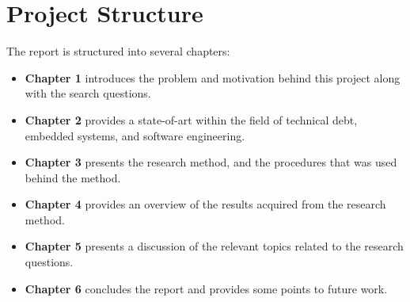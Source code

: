 \section{Project Structure}
The report is structured into several chapters:
\begin{itemize}
	\item \textbf{Chapter 1} introduces the problem and motivation behind this project along with the search questions.
	\item \textbf{Chapter 2} provides a state-of-art within the field of technical debt, embedded systems, and software engineering.
	\item \textbf{Chapter 3} presents the research method, and the procedures that was used behind the method.
	\item \textbf{Chapter 4} provides an overview of the results acquired from the research method.
	\item \textbf{Chapter 5} presents a discussion of the relevant topics related to the research questions.
	\item \textbf{Chapter 6} concludes the report and provides some points to future work. 
\end{itemize}

